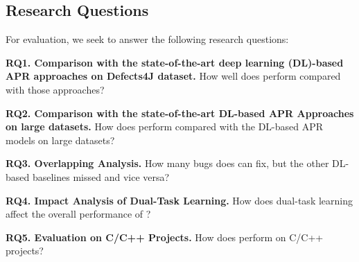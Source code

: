 \subsection{Research Questions}

For evaluation, we seek to answer the following research questions:

\noindent\textbf{RQ1. Comparison with the state-of-the-art deep learning
  (DL)-based APR approaches on Defects4J dataset.}  How well does
                {\tool} perform compared with those approaches?



\noindent\textbf{RQ2. Comparison with the state-of-the-art DL-based APR Approaches on large datasets.}  
How does {\tool} perform compared with the DL-based APR models on large datasets?


\noindent\textbf{RQ3. Overlapping Analysis.} How many bugs does
{\tool} can fix, but the other DL-based baselines
                missed and vice versa?

\noindent\textbf{RQ4. Impact Analysis of Dual-Task Learning.} How does
dual-task learning affect the overall performance of {\tool}?


\noindent\textbf{RQ5. Evaluation on C/C++ Projects.} How does {\tool} perform on C/C++ projects?
